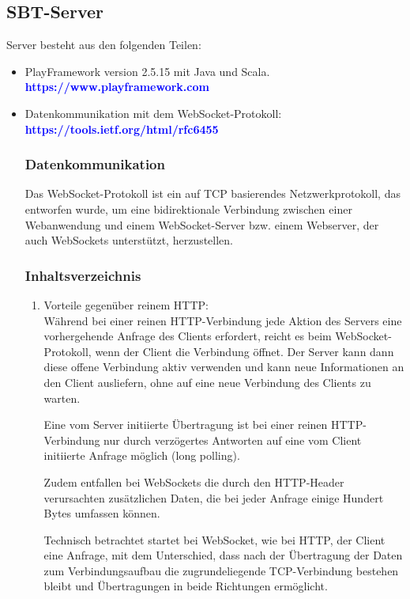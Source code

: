 \subsection{SBT-Server}
\label{sec:server}
Server besteht aus den folgenden Teilen:
\begin{itemize}
\item PlayFramework version  2.5.15 mit Java und Scala.\\
\textcolor{blue}{\textbf{\textup{https://www.playframework.com}}}
\item Datenkommunikation mit dem WebSocket-Protokoll:\\
\textcolor{blue}{\textbf{\textup{https://tools.ietf.org/html/rfc6455}}}
\subsubsection{Datenkommunikation}

Das WebSocket-Protokoll ist ein auf TCP basierendes Netzwerkprotokoll, das entworfen wurde, um eine bidirektionale Verbindung zwischen einer Webanwendung und einem WebSocket-Server bzw. einem Webserver, der auch WebSockets unterstützt, herzustellen.
\subsubsection{Inhaltsverzeichnis}
\begin{enumerate}
\item Vorteile gegenüber reinem HTTP:\\
Während bei einer reinen HTTP-Verbindung jede Aktion des Servers eine vorhergehende Anfrage des Clients erfordert, reicht es beim WebSocket-Protokoll, wenn der Client die Verbindung öffnet. Der Server kann dann diese offene Verbindung aktiv verwenden und kann neue Informationen an den Client ausliefern, ohne auf eine neue Verbindung des Clients zu warten.

Eine vom Server initiierte Übertragung ist bei einer reinen HTTP-Verbindung nur durch verzögertes Antworten auf eine vom Client initiierte Anfrage möglich (long polling).

Zudem entfallen bei WebSockets die durch den HTTP-Header verursachten zusätzlichen Daten, die bei jeder Anfrage einige Hundert Bytes umfassen können.

Technisch betrachtet startet bei WebSocket, wie bei HTTP, der Client eine Anfrage, mit dem Unterschied, dass nach der Übertragung der Daten zum Verbindungsaufbau die zugrundeliegende TCP-Verbindung bestehen bleibt und Übertragungen in beide Richtungen ermöglicht.



\end{enumerate}
\end{itemize}
